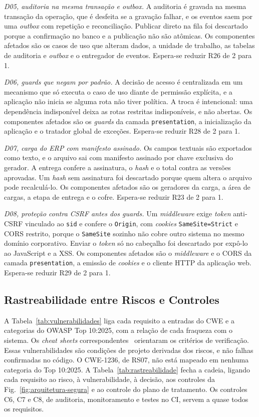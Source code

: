 \documentclass[conference]{IEEEtran}
\begin{document}
\emph{D05, auditoria na mesma transação e \textit{outbox}.} A auditoria é gravada na mesma transação da operação, que é desfeita se a gravação falhar, e os eventos saem por uma \textit{outbox} com repetição e reconciliação. Publicar direto na fila foi descartado porque a confirmação no banco e a publicação não são atômicas. Os componentes afetados são os casos de uso que alteram dados, a unidade de trabalho, as tabelas de auditoria e \textit{outbox} e o entregador de eventos. Espera-se reduzir R26 de 2 para 1.

\emph{D06, \textit{guards} que negam por padrão.} A decisão de acesso é centralizada em um mecanismo que só executa o caso de uso diante de permissão explícita, e a aplicação não inicia se alguma rota não tiver política. A troca é intencional: uma dependência indisponível deixa as rotas restritas indisponíveis, e não abertas. Os componentes afetados são os \textit{guards} da camada \texttt{presentation}, a inicialização da aplicação e o tratador global de exceções. Espera-se reduzir R28 de 2 para 1.

\emph{D07, carga do ERP com manifesto assinado.} Os campos textuais são exportados como texto, e o arquivo sai com manifesto assinado por chave exclusiva do gerador. A entrega confere a assinatura, o \textit{hash} e o total contra as versões aprovadas. Um \textit{hash} sem assinatura foi descartado porque quem altera o arquivo pode recalculá-lo. Os componentes afetados são os geradores da carga, a área de cargas, a etapa de entrega e o cofre. Espera-se reduzir R23 de 2 para 1.

\emph{D08, proteção contra CSRF antes dos \textit{guards}.} Um \textit{middleware} exige \textit{token} anti-CSRF vinculado ao \texttt{sid} e confere o \texttt{Origin}, com \textit{cookies} \texttt{SameSite=Strict} e CORS restrito, porque o \texttt{SameSite} sozinho não cobre outro sistema no mesmo domínio corporativo. Enviar o \textit{token} só no cabeçalho foi descartado por expô-lo ao JavaScript e a XSS. Os componentes afetados são o \textit{middleware} e o CORS da camada \texttt{presentation}, a emissão de \textit{cookies} e o cliente HTTP da aplicação web. Espera-se reduzir R29 de 2 para 1.

\subsection{Rastreabilidade entre Riscos e Controles}
\label{subsec:rastreabilidade}
\label{subsec:vulnerabilidades}

A Tabela~\ref{tab:vulnerabilidades} liga cada requisito a entradas do CWE e a categorias do OWASP Top 10:2025, com a relação de cada fraqueza com o sistema. Os \textit{cheat sheets} correspondentes~\cite{owaspcheatsheets} orientaram os critérios de verificação. Essas vulnerabilidades são condições de projeto derivadas dos riscos, e não falhas confirmadas no código. O CWE-1236, de RS07, não está mapeado em nenhuma categoria do Top 10:2025. A Tabela~\ref{tab:rastreabilidade} fecha a cadeia, ligando cada requisito ao risco, à vulnerabilidade, à decisão, aos controles da Fig.~\ref{fig:arquitetura-segura} e ao controle do plano de tratamento. Os controles C6, C7 e C8, de auditoria, monitoramento e testes no CI, servem a quase todos os requisitos.
\end{document}
